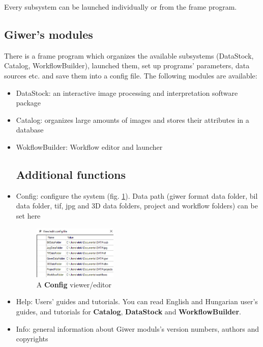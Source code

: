 \documentclass[a4paper,12pt]{article}
\begin{document}
Every subsystem can be launched individually or from the frame program.

\subsection{Giwer’s modules}

There is a frame program which organizes the available subsystems (DataStock, Catalog, WorkflowBuilder), launched them, set up programs' parameters, data sources etc. and save them into a config file. The following modules are available:
\begin{itemize}
	\item DataStock: an interactive image processing and interpretation software package
	\item Catalog: organizes large amounts of images and stores their attributes in a database
	\item WokflowBuilder: Workflow editor and launcher


\subsection{Additional functions}

	\item Config: configure the system (fig. \ref{fig:config}). Data path (giwer format data folder, bil data folder, tif, jpg and 3D data folders, project and workflow folders) can be set here

	\begin{figure}
	\centering
	\includegraphics[width=4cm]{config.png}
	\caption{A \textbf{Config} viewer/editor}
	\label{fig:config}
\end{figure}

	\item Help: Users' guides and tutorials. You can read English and Hungarian user's guides, and tutorials for \textbf{Catalog}, \textbf{DataStock} and \textbf{WorkflowBuilder}.
	
	\item Info: general information about Giwer moduls's version numbers, authors and copyrights
\end{itemize}

\end{document}
